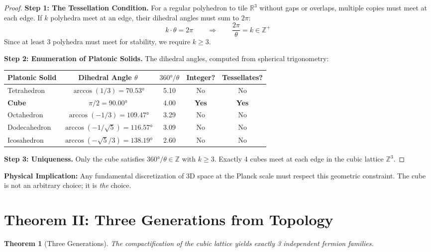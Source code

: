 \documentclass[11pt,a4paper]{article}
\theoremstyle{plain}
\newtheorem{theorem}{Theorem}[section]
\theoremstyle{definition}
\theoremstyle{remark}
\begin{document}
\begin{proof}
\textbf{Step 1: The Tessellation Condition.} For a regular polyhedron to tile $\mathbb{R}^3$ without gaps or overlaps, multiple copies must meet at each edge. If $k$ polyhedra meet at an edge, their dihedral angles must sum to $2\pi$:
\[
k \cdot \theta = 2\pi \qquad \Rightarrow \qquad \frac{2\pi}{\theta} = k \in \mathbb{Z}^+
\]
Since at least 3 polyhedra must meet for stability, we require $k \geq 3$.

\textbf{Step 2: Enumeration of Platonic Solids.} The dihedral angles, computed from spherical trigonometry:

\begin{center}
\begin{tabular}{lcccc}
\toprule
\textbf{Platonic Solid} & \textbf{Dihedral Angle} $\theta$ & $360°/\theta$ & \textbf{Integer?} & \textbf{Tessellates?} \\
\midrule
Tetrahedron & $\arccos(1/3) = 70.53°$ & 5.10 & No & No \\
\textbf{Cube} & $\pi/2 = 90.00°$ & 4.00 & \textbf{Yes} & \textbf{Yes} \\
Octahedron & $\arccos(-1/3) = 109.47°$ & 3.29 & No & No \\
Dodecahedron & $\arccos(-1/\sqrt{5}) = 116.57°$ & 3.09 & No & No \\
Icosahedron & $\arccos(-\sqrt{5}/3) = 138.19°$ & 2.60 & No & No \\
\bottomrule
\end{tabular}
\end{center}

\textbf{Step 3: Uniqueness.} Only the cube satisfies $360°/\theta \in \mathbb{Z}$ with $k \geq 3$. Exactly 4 cubes meet at each edge in the cubic lattice $\mathbb{Z}^3$.
\end{proof}

\textbf{Physical Implication:} Any fundamental discretization of 3D space at the Planck scale must respect this geometric constraint. The cube is not an arbitrary choice; it is \emph{the} choice.

\section{Theorem II: Three Generations from Topology}

\begin{theorem}[Three Generations]
The compactification of the cubic lattice yields exactly 3 independent fermion families.
\end{theorem}
\end{document}
